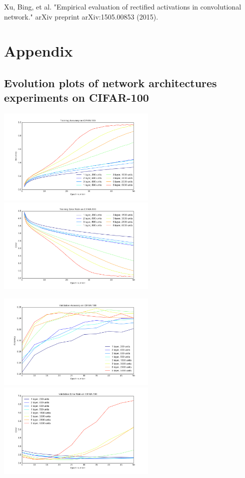 \documentclass[]{article}
\begin{document}
Xu, Bing, et al. "Empirical evaluation of rectified activations in convolutional network." arXiv preprint arXiv:1505.00853 (2015).

\newpage
\section{Appendix}
\subsection{Evolution plots of network architectures experiments on CIFAR-100}
\includegraphics[width=3in]{NN_architures_train_acc_100}
\includegraphics[width=3in]{NN_architures_train_err_100}

\includegraphics[width=3in]{NN_architures_valid_acc_100}
\includegraphics[width=3in]{NN_architures_valid_err_100}
\end{document}
